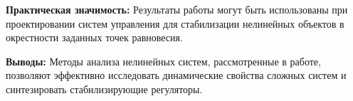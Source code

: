 \textbf{Практическая значимость:} Результаты работы могут быть использованы при проектировании систем управления для стабилизации нелинейных объектов в окрестности заданных точек равновесия.

\textbf{Выводы:} Методы анализа нелинейных систем, рассмотренные в работе, позволяют эффективно исследовать динамические свойства сложных систем и синтезировать стабилизирующие регуляторы.
